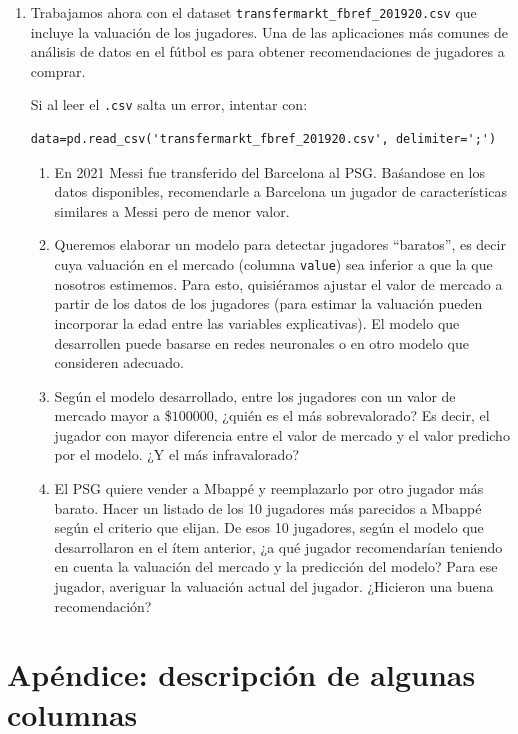 \documentclass[a4paper,11pt]{article}
\theoremstyle{definition}
\begin{document}
\begin{enumerate}[resume]
\item Trabajamos ahora con el dataset \lstinline{transfermarkt_fbref_201920.csv} que incluye la valuación de los jugadores.
Una de las aplicaciones más comunes de análisis de datos en el fútbol es para obtener recomendaciones de jugadores a comprar.

Si al leer el \verb|.csv| salta un error, intentar con:
\begin{lstlisting}
data=pd.read_csv('transfermarkt_fbref_201920.csv', delimiter=';')
\end{lstlisting}

\begin{enumerate}
\item En 2021 Messi fue transferido del Barcelona al PSG. Baśandose en los datos disponibles, recomendarle a
Barcelona un jugador de características similares  a Messi pero de menor valor.
\item Queremos elaborar un modelo para detectar jugadores ``baratos'', es decir cuya valuación en el mercado (columna
\verb|value|) sea
inferior a que la que nosotros estimemos. Para esto, quisiéramos ajustar el valor de mercado a partir de los datos de
los jugadores (para estimar la valuación pueden incorporar la edad entre las variables explicativas). El modelo que desarrollen puede basarse en redes neuronales o en otro modelo que consideren adecuado.
\item Según el modelo desarrollado, entre los jugadores con un valor de mercado mayor a \$$100000$,
¿quién es el más sobrevalorado? Es decir, el jugador con mayor diferencia entre el valor de mercado y el valor predicho por el modelo. ¿Y el más infravalorado?
\item El PSG quiere vender a Mbappé y reemplazarlo por otro jugador más barato. Hacer un listado de los 10 jugadores
más parecidos a Mbappé según el criterio que elijan. De esos 10 jugadores, según el modelo que desarrollaron en el
ítem anterior, ¿a qué jugador recomendarían teniendo en cuenta la valuación del mercado y la predicción del modelo? Para ese jugador, averiguar la valuación actual del jugador. ¿Hicieron una buena recomendación?
\end{enumerate}
\end{enumerate}

\section*{Apéndice: descripción de algunas columnas}
\end{document}
